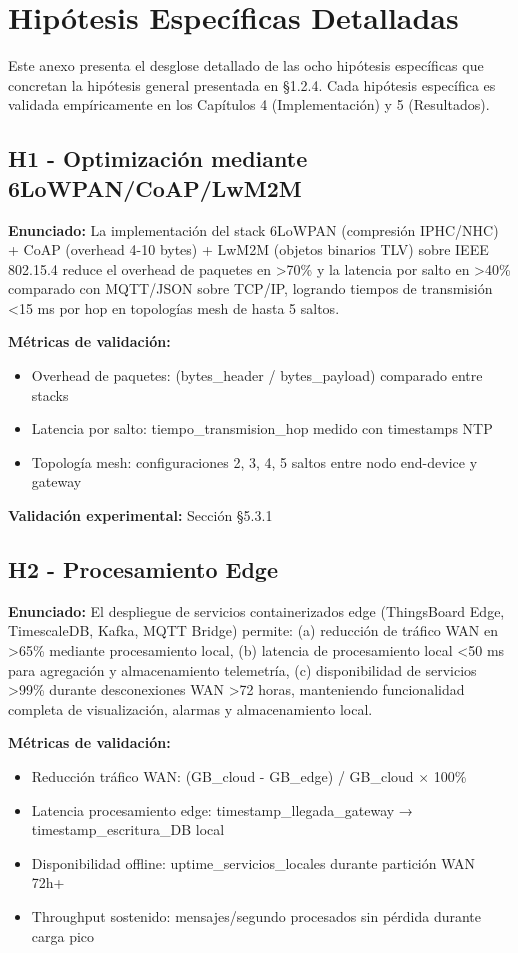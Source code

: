 ﻿\chapter{Hipótesis Específicas Detalladas}
\label{anexo:hipotesis-detalladas}

Este anexo presenta el desglose detallado de las ocho hipótesis específicas que concretan la hipótesis general presentada en §1.2.4. Cada hipótesis específica es validada empíricamente en los Capítulos 4 (Implementación) y 5 (Resultados).

\section{H1 - Optimización mediante 6LoWPAN/CoAP/LwM2M}

\textbf{Enunciado:} La implementación del stack 6LoWPAN (compresión IPHC/NHC) + CoAP (overhead 4-10 bytes) + LwM2M (objetos binarios TLV) sobre IEEE 802.15.4 reduce el overhead de paquetes en >70\% y la latencia por salto en >40\% comparado con MQTT/JSON sobre TCP/IP, logrando tiempos de transmisión <15 ms por hop en topologías mesh de hasta 5 saltos.

\textbf{Métricas de validación:}
\begin{itemize}
\item Overhead de paquetes: (bytes\_header / bytes\_payload) comparado entre stacks
\item Latencia por salto: tiempo\_transmision\_hop medido con timestamps NTP
\item Topología mesh: configuraciones 2, 3, 4, 5 saltos entre nodo end-device y gateway
\end{itemize}

\textbf{Validación experimental:} Sección §5.3.1

\section{H2 - Procesamiento Edge}

\textbf{Enunciado:} El despliegue de servicios containerizados edge (ThingsBoard Edge, TimescaleDB, Kafka, MQTT Bridge) permite: (a) reducción de tráfico WAN en >65\% mediante procesamiento local, (b) latencia de procesamiento local <50 ms para agregación y almacenamiento telemetría, (c) disponibilidad de servicios >99\% durante desconexiones WAN >72 horas, manteniendo funcionalidad completa de visualización, alarmas y almacenamiento local.

\textbf{Métricas de validación:}
\begin{itemize}
\item Reducción tráfico WAN: (GB\_cloud - GB\_edge) / GB\_cloud $\times$ 100\%
\item Latencia procesamiento edge: timestamp\_llegada\_gateway → timestamp\_escritura\_DB local
\item Disponibilidad offline: uptime\_servicios\_locales durante partición WAN 72h+
\item Throughput sostenido: mensajes/segundo procesados sin pérdida durante carga pico
\end{itemize}

